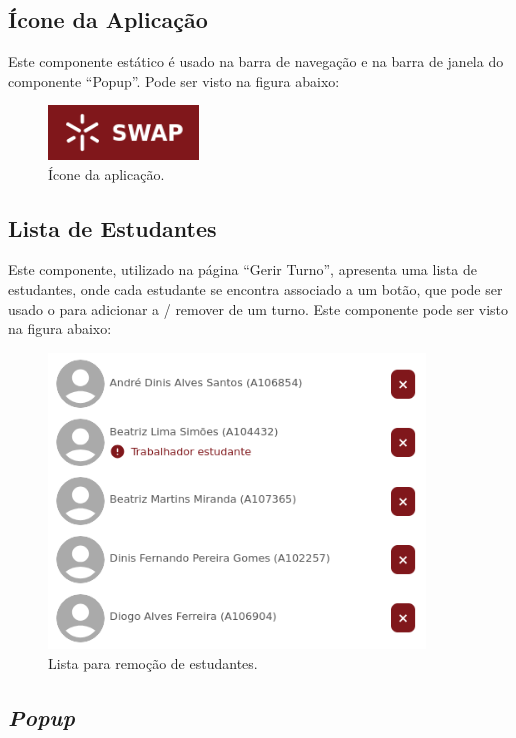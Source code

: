 \documentclass[12pt, a4paper]{article}
\begin{document}
\subsection{Ícone da Aplicação}

Este componente estático é usado na barra de navegação e na barra de janela do componente ``Popup''.
Pode ser visto na figura abaixo:

\begin{figure}[H]
    \centering
    \includegraphics[width=4cm]{res/components/application-icon.png}
    \caption{Ícone da aplicação.}
    \label{application-icon}
\end{figure}

\subsection{Lista de Estudantes}

Este componente, utilizado na página ``Gerir Turno'', apresenta uma lista de estudantes, onde cada
estudante se encontra associado a um botão, que pode ser usado o para adicionar a / remover de um
turno. Este componente pode ser visto na figura abaixo:

\begin{figure}[H]
    \centering
    \includegraphics[width=10cm]{res/components/student-list.png}
    \caption{Lista para remoção de estudantes.}
    \label{student-list}
\end{figure}

\subsection{\emph{Popup}}
\end{document}
